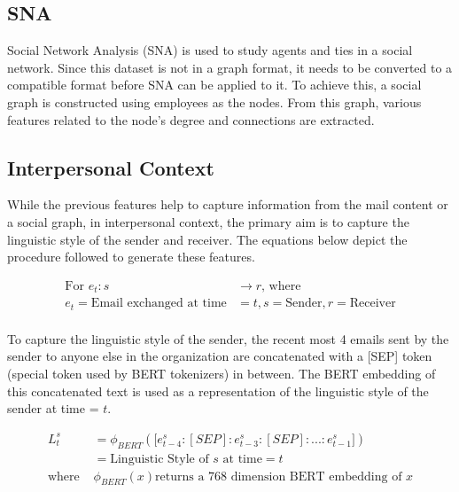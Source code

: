 \subsection{SNA}

Social Network Analysis (SNA) is used to study agents and ties in a social network. Since this dataset is not in a graph format, it needs to be converted to a compatible format before SNA can be applied to it. To achieve this, a social graph is constructed using employees as the nodes. From this graph, various features related to the node's degree and connections are extracted. 



\subsection{Interpersonal Context}

While the previous features help to capture information from the mail content or a social graph, in interpersonal context, the primary aim is to capture the linguistic style of the sender and receiver. The equations below depict the procedure followed to generate these features.

\begin{equation}
\begin{aligned}
\text{For }e_t : s &\rightarrow r \text{, where}\\
e_t = \text{Email exchanged at time} &= t, s = \text{Sender},  r = \text{Receiver} \\ 
\end{aligned}
\end{equation}

To capture the linguistic style of the sender, the recent most 4 emails sent by the sender to anyone else in the organization are concatenated with  a [SEP] token (special token used by BERT tokenizers) in between. The BERT embedding of this concatenated text is used as a representation of the linguistic style of the sender at time = $t$.

\begin{equation}
\begin{aligned}
L_{t}^{s} &= \phi_{BERT} \left( \bigl[ e_{t-4}^{s}:[SEP]:e_{t-3}^{s}:[SEP]:...:e_{t-1}^{s} \bigr]\right) \\
&= \text{Linguistic Style of $s$ at time} = t \\
\text{where } &\phi_{BERT} \left( x \right) \text{returns a 768 dimension BERT embedding of $x$} 
\end{aligned}
\end{equation}

